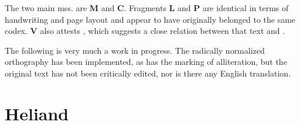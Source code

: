 The two main mss. are \textbf{M} and \textbf{C}.  Fragments \textbf{L} and \textbf{P} are identical in terms of handwriting and page layout and appear to have originally belonged to the same codex.  \textbf{V} also attests \SaxonGenesis, which suggests a close relation between that text and \Heliand.

\sectionline

The following is very much a work in progress.  The radically normalized orthography has been implemented, as has the marking of alliteration, but the original text has not been critically edited, nor is there any English translation.

\sectionline

\section{Heliand}


